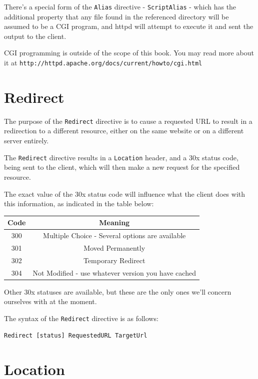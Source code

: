 There's a special form of the \verb~Alias~ directive - \verb~ScriptAlias~ - which has the additional property that any file found in the referenced directory will be assumed to be a CGI program, and httpd will attempt to execute it and sent the output to the client.

CGI programming is outside of the scope of this book. You may read more about it at \verb~http://httpd.apache.org/docs/current/howto/cgi.html~

\section{Redirect}
\label{redirect}

The purpose of the \verb~Redirect~ directive is to cause a requested URL to result in a redirection to a different resource, either on the same website or on a different server entirely.

The \verb~Redirect~ directive results in a \verb~Location~ header, and a 30x status code, being sent to the client, which will then make a new request for the specified resource.

The exact value of the 30x status code will influence what the client does with this information, as indicated in the table below:

\begin{tabular}{|c|c|}
\hline Code  & Meaning  \\ 
\hline 300 & Multiple Choice - Several options are available \\ 
\hline 301 & Moved Permanently \\
\hline 302 & Temporary Redirect \\
\hline 304 & Not Modified - use whatever version you have cached \\
\hline 
\end{tabular} 

Other 30x statuses are available, but these are the only ones we'll concern ourselves with at the moment.

The syntax of the \verb~Redirect~ directive is as follows:

\begin{verbatim}
Redirect [status] RequestedURL TargetUrl
\end{verbatim}

\section{Location}

